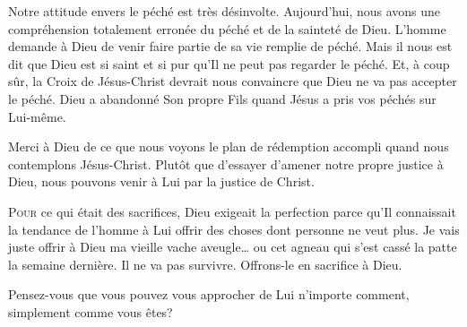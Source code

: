 Notre attitude envers le péché est très désinvolte.
 Aujourd'hui, nous avons une compréhension totalement erronée du péché
 et de la sainteté de Dieu.
 L'homme demande à Dieu de venir faire partie de sa vie remplie de péché.
 Mais il nous est dit que Dieu est si saint et si pur
 qu'Il ne peut pas regarder le péché.
 Et, à coup sûr, la Croix de Jésus-Christ devrait nous convaincre
 que Dieu ne va pas accepter le péché.
 Dieu a abandonné Son propre Fils quand Jésus a pris vos péchés
 sur Lui-même.


Merci à Dieu de ce que nous voyons le plan de rédemption accompli
 quand nous contemplons Jésus-Christ.
 Plutôt que d'essayer d'amener notre propre justice à Dieu,
 nous pouvons venir à Lui par la justice de Christ. 

\dvrule







\lettrine{P}{our} ce qui était des sacrifices,
 Dieu exigeait la perfection parce qu'Il connaissait la tendance
 de l'homme à Lui offrir des choses dont personne ne veut plus.
 \Og Je vais juste offrir à Dieu ma vieille vache aveugle\dots{}
 ou cet agneau qui s'est cassé la patte la semaine dernière.
 Il ne va pas survivre. Offrons-le en sacrifice à Dieu. \Fg{}


Pensez-vous que vous pouvez vous approcher de Lui n'importe comment,
 simplement comme vous êtes? 

